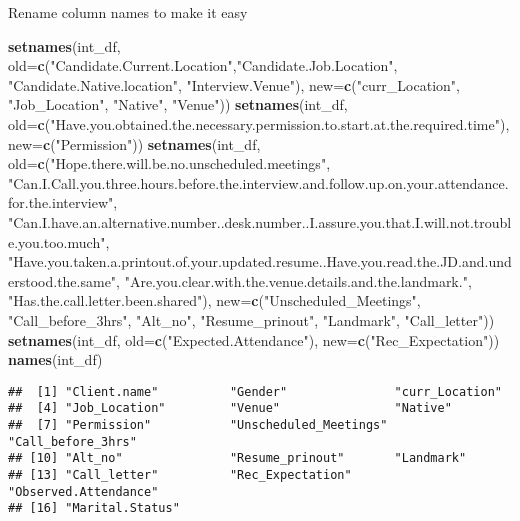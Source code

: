 \documentclass[]{article}
\newenvironment{Shaded}{\begin{snugshade}}{\end{snugshade}}
\newcommand{\KeywordTok}[1]{\textcolor[rgb]{0.13,0.29,0.53}{\textbf{#1}}}
\newcommand{\DataTypeTok}[1]{\textcolor[rgb]{0.13,0.29,0.53}{#1}}
\newcommand{\StringTok}[1]{\textcolor[rgb]{0.31,0.60,0.02}{#1}}
\newcommand{\NormalTok}[1]{#1}
\begin{document}
Rename column names to make it easy

\begin{Shaded}
\begin{Highlighting}[]
\KeywordTok{setnames}\NormalTok{(int_df, }\DataTypeTok{old=}\KeywordTok{c}\NormalTok{(}\StringTok{"Candidate.Current.Location"}\NormalTok{,}\StringTok{"Candidate.Job.Location"}\NormalTok{, }\StringTok{"Candidate.Native.location"}\NormalTok{, }\StringTok{"Interview.Venue"}\NormalTok{), }\DataTypeTok{new=}\KeywordTok{c}\NormalTok{(}\StringTok{"curr_Location"}\NormalTok{, }\StringTok{"Job_Location"}\NormalTok{, }\StringTok{"Native"}\NormalTok{, }\StringTok{"Venue"}\NormalTok{))}
\KeywordTok{setnames}\NormalTok{(int_df, }\DataTypeTok{old=}\KeywordTok{c}\NormalTok{(}\StringTok{"Have.you.obtained.the.necessary.permission.to.start.at.the.required.time"}\NormalTok{), }\DataTypeTok{new=}\KeywordTok{c}\NormalTok{(}\StringTok{"Permission"}\NormalTok{))}
\KeywordTok{setnames}\NormalTok{(int_df, }\DataTypeTok{old=}\KeywordTok{c}\NormalTok{(}\StringTok{"Hope.there.will.be.no.unscheduled.meetings"}\NormalTok{, }\StringTok{"Can.I.Call.you.three.hours.before.the.interview.and.follow.up.on.your.attendance.for.the.interview"}\NormalTok{, }\StringTok{"Can.I.have.an.alternative.number..desk.number..I.assure.you.that.I.will.not.trouble.you.too.much"}\NormalTok{, }\StringTok{"Have.you.taken.a.printout.of.your.updated.resume..Have.you.read.the.JD.and.understood.the.same"}\NormalTok{, }\StringTok{"Are.you.clear.with.the.venue.details.and.the.landmark."}\NormalTok{, }\StringTok{"Has.the.call.letter.been.shared"}\NormalTok{), }\DataTypeTok{new=}\KeywordTok{c}\NormalTok{(}\StringTok{"Unscheduled_Meetings"}\NormalTok{, }\StringTok{"Call_before_3hrs"}\NormalTok{, }\StringTok{"Alt_no"}\NormalTok{, }\StringTok{"Resume_prinout"}\NormalTok{, }\StringTok{"Landmark"}\NormalTok{, }\StringTok{"Call_letter"}\NormalTok{))}
\KeywordTok{setnames}\NormalTok{(int_df, }\DataTypeTok{old=}\KeywordTok{c}\NormalTok{(}\StringTok{"Expected.Attendance"}\NormalTok{), }\DataTypeTok{new=}\KeywordTok{c}\NormalTok{(}\StringTok{"Rec_Expectation"}\NormalTok{))}
\KeywordTok{names}\NormalTok{(int_df)}
\end{Highlighting}
\end{Shaded}

\begin{verbatim}
##  [1] "Client.name"          "Gender"               "curr_Location"       
##  [4] "Job_Location"         "Venue"                "Native"              
##  [7] "Permission"           "Unscheduled_Meetings" "Call_before_3hrs"    
## [10] "Alt_no"               "Resume_prinout"       "Landmark"            
## [13] "Call_letter"          "Rec_Expectation"      "Observed.Attendance" 
## [16] "Marital.Status"
\end{verbatim}
\end{document}
